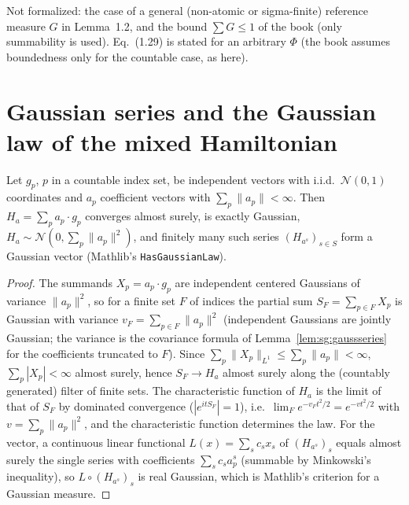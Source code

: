 \begin{remark}
Not formalized: the case of a general (non-atomic or sigma-finite) reference measure $G$ in Lemma~1.2, and the bound $\sum G\le1$ of the book
(only summability is used). Eq.~(1.29) is stated for an arbitrary $\Phi$ (the book assumes boundedness only for the countable case, as here).
\end{remark}

\section{Gaussian series and the Gaussian law of the mixed Hamiltonian}\label{sec:sg:serieslaw}

\begin{lemma}\label{lem:sg:serieslaw}
  \leanok
Let $g_p$, $p$ in a countable index set, be independent vectors with i.i.d.\ $\mathcal N(0,1)$ coordinates and $a_p$ coefficient vectors with
$\sum_p\|a_p\|<\infty$. Then $H_a=\sum_pa_p\cdot g_p$ converges almost surely, is exactly Gaussian,
$H_a\sim\mathcal N(0,\sum_p\|a_p\|^2)$, and finitely many such series $(H_{a^s})_{s\in S}$ form a Gaussian vector (Mathlib's
\texttt{HasGaussianLaw}).
\end{lemma}

\begin{proof}
  \leanok
The summands $X_p=a_p\cdot g_p$ are independent centered Gaussians of variance $\|a_p\|^2$, so for a finite set $F$ of indices the partial sum
$S_F=\sum_{p\in F}X_p$ is Gaussian with variance $v_F=\sum_{p\in F}\|a_p\|^2$ (independent Gaussians are jointly Gaussian; the variance is the
covariance formula of Lemma~\ref{lem:sg:gaussseries} for the coefficients truncated to $F$). Since $\sum_p\|X_p\|_{L^1}\le\sum_p\|a_p\|<\infty$,
$\sum_p|X_p|<\infty$ almost surely, hence $S_F\to H_a$ almost surely along the (countably generated) filter of finite sets. The characteristic
function of $H_a$ is the limit of that of $S_F$ by dominated convergence ($|e^{itS_F}|=1$), i.e.\ $\lim_Fe^{-v_Ft^2/2}=e^{-vt^2/2}$ with $v=\sum_p\|a_p\|^2$, and the characteristic function determines the law.
For the vector, a continuous linear functional $L(x)=\sum_sc_sx_s$ of $(H_{a^s})_s$ equals almost surely the single series with coefficients
$\sum_sc_sa^s_p$ (summable by Minkowski's inequality), so $L\circ(H_{a^s})_s$ is real Gaussian, which is Mathlib's criterion for a Gaussian measure.
\end{proof}

